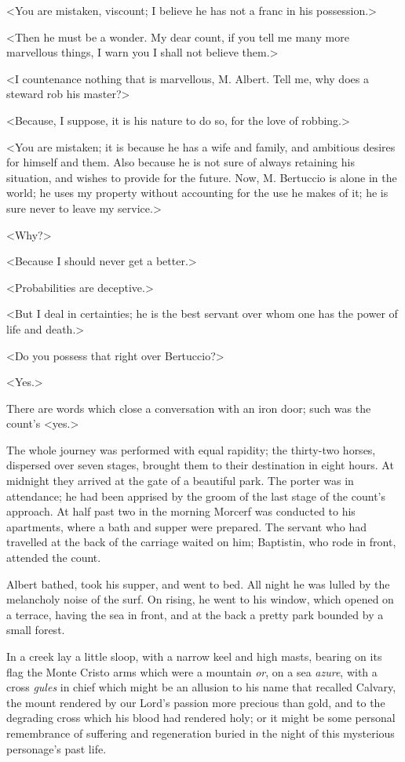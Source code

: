  <You are mistaken, viscount; I believe he has not a franc in his possession.> 

 <Then he must be a wonder. My dear count, if you tell me many more marvellous things, I warn you I shall not believe them.> 

 <I countenance nothing that is marvellous, M. Albert. Tell me, why does a steward rob his master?> 

 <Because, I suppose, it is his nature to do so, for the love of robbing.> 

 <You are mistaken; it is because he has a wife and family, and ambitious desires for himself and them. Also because he is not sure of always retaining his situation, and wishes to provide for the future. Now, M. Bertuccio is alone in the world; he uses my property without accounting for the use he makes of it; he is sure never to leave my service.> 

 <Why?> 

 <Because I should never get a better.> 

 <Probabilities are deceptive.> 

 <But I deal in certainties; he is the best servant over whom one has the power of life and death.> 

 <Do you possess that right over Bertuccio?> 

 <Yes.> 

 There are words which close a conversation with an iron door; such was the count's <yes.> 

 The whole journey was performed with equal rapidity; the thirty-two horses, dispersed over seven stages, brought them to their destination in eight hours. At midnight they arrived at the gate of a beautiful park. The porter was in attendance; he had been apprised by the groom of the last stage of the count's approach. At half past two in the morning Morcerf was conducted to his apartments, where a bath and supper were prepared. The servant who had travelled at the back of the carriage waited on him; Baptistin, who rode in front, attended the count. 

 Albert bathed, took his supper, and went to bed. All night he was lulled by the melancholy noise of the surf. On rising, he went to his window, which opened on a terrace, having the sea in front, and at the back a pretty park bounded by a small forest. 

 In a creek lay a little sloop, with a narrow keel and high masts, bearing on its flag the Monte Cristo arms which were a mountain \textit{or}, on a sea \textit{azure}, with a cross \textit{gules} in chief which might be an allusion to his name that recalled Calvary, the mount rendered by our Lord's passion more precious than gold, and to the degrading cross which his blood had rendered holy; or it might be some personal remembrance of suffering and regeneration buried in the night of this mysterious personage's past life. 

